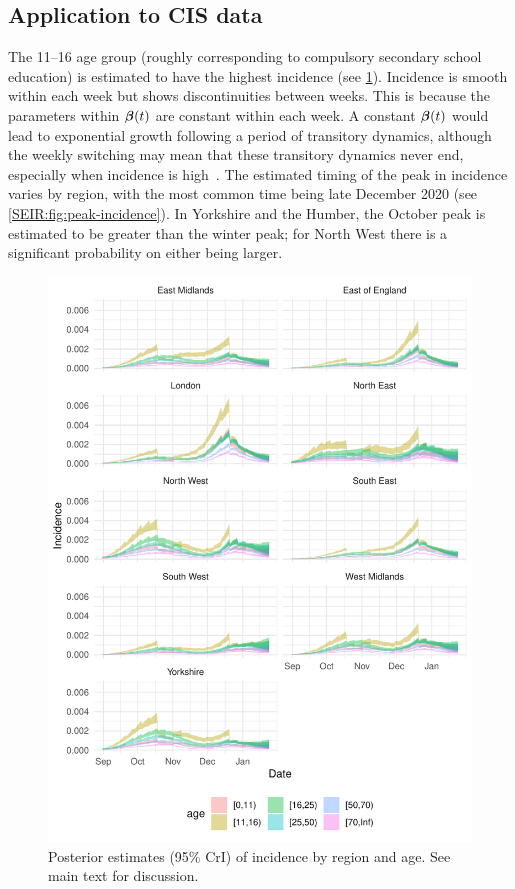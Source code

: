 \documentclass[thesis.tex]{subfiles}
\begin{document}
\subsection{Application to CIS data} \label{SEIR:sec:application}

The 11--16 age group (roughly corresponding to compulsory secondary school education) is estimated to have the highest incidence (see \cref{SEIR:fig:incidence}).
Incidence is smooth within each week but shows discontinuities between weeks.
This is because the parameters within $\bm{\beta}(t)$ are constant within each week.
A constant $\bm{\beta}(t)$ would lead to exponential growth following a period of transitory dynamics, although the weekly switching may mean that these transitory dynamics never end, especially when incidence is high~\autocite{rhodesConvergence}.
The estimated timing of the peak in incidence varies by region, with the most common time being late December 2020 (see \cref{SEIR:fig:peak-incidence}).
In Yorkshire and the Humber, the October peak is estimated to be greater than the winter peak; for North West there is a significant probability on either being larger.
\begin{figure}
    \includegraphics{SEIR/CIS/incidence}
    \caption[Posterior estimates of incidence]{%
        Posterior estimates (95\% CrI) of incidence by region and age.
        See main text for discussion.
    }
    \label{SEIR:fig:incidence}
\end{figure}
\end{document}
